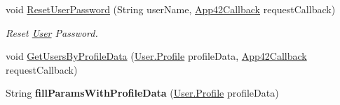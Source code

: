 \begin{DoxyCompactItemize}
\item 
void \hyperlink{classcom_1_1shephertz_1_1app42_1_1paas_1_1sdk_1_1windows_1_1user_1_1_user_service_a90c9a3b5142911fdfea5886759320de2}{Reset\+User\+Password} (String user\+Name, \hyperlink{interfacecom_1_1shephertz_1_1app42_1_1paas_1_1sdk_1_1windows_1_1_app42_callback}{App42\+Callback} request\+Callback)
\begin{DoxyCompactList}\small\item\em Reset \hyperlink{classcom_1_1shephertz_1_1app42_1_1paas_1_1sdk_1_1windows_1_1user_1_1_user}{User} Password. \end{DoxyCompactList}\item 
void \hyperlink{classcom_1_1shephertz_1_1app42_1_1paas_1_1sdk_1_1windows_1_1user_1_1_user_service_a754d12fe9f086c18ffe1a1c807d84a12}{Get\+Users\+By\+Profile\+Data} (\hyperlink{classcom_1_1shephertz_1_1app42_1_1paas_1_1sdk_1_1windows_1_1user_1_1_user_1_1_profile}{User.\+Profile} profile\+Data, \hyperlink{interfacecom_1_1shephertz_1_1app42_1_1paas_1_1sdk_1_1windows_1_1_app42_callback}{App42\+Callback} request\+Callback)
\item 
\hypertarget{classcom_1_1shephertz_1_1app42_1_1paas_1_1sdk_1_1windows_1_1user_1_1_user_service_a1e843336d5a515f9455deb96312a7767}{String {\bfseries fill\+Params\+With\+Profile\+Data} (\hyperlink{classcom_1_1shephertz_1_1app42_1_1paas_1_1sdk_1_1windows_1_1user_1_1_user_1_1_profile}{User.\+Profile} profile\+Data)}\label{classcom_1_1shephertz_1_1app42_1_1paas_1_1sdk_1_1windows_1_1user_1_1_user_service_a1e843336d5a515f9455deb96312a7767}


\end{DoxyCompactItemize}
